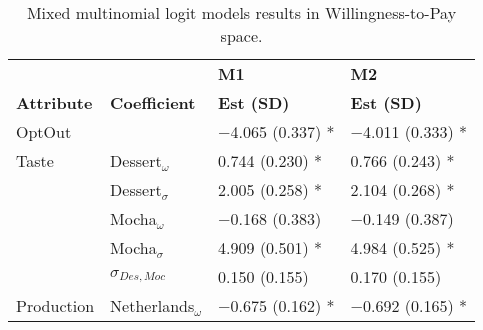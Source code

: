 \documentclass[sustainability,article,accept,moreauthors,pdftex,10pt,a4paper]{Definitions/mdpi}
\theoremstyle{mdpi}
\newcounter{ex}
\newcounter{re}
\theoremstyle{mdpidefinition}
\begin{document}
{{\begin{table}[H]
\centering
\caption{ Mixed multinomial logit models %
results in Willingness-to-Pay space.}
\vspace{-6pt}
\label{tablewtpmmnl}
\begin{tabular}{p{2cm}p{3.5cm} p{3cm} p{3cm}} \\ \toprule
&              & \multicolumn{1}{l}{\textbf{M1}}    & \multicolumn{1}{l}{\textbf{M2}}     \\ %
\textbf{Attribute} & \textbf{Coefficient} &               \textbf{Est (SD) }                    & \textbf{Est (SD) }                    \\ \midrule%
OptOut   &  &                              $-$4.065  (0.337) *              & $-$4.011 (0.333) *              \\
\midrule %
Taste  & Dessert$_\omega$ &              0.744 (0.230) *               & 0.766 (0.243) *               \\ %
& Dessert$_\sigma$ &             2.005 (0.258) *               & 2.104 (0.268) *               \\ %
& Mocha$_\omega$ &                $-$0.168 (0.383)               & $-$0.149 (0.387)               \\ %
& Mocha$_\sigma$ &               4.909 (0.501) *               & 4.984 (0.525) *               \\ %
& $\sigma_{Des,Moc}$&    0.150 (0.155)                & 0.170 (0.155)                \\ %
\midrule
Production&Netherlands$_\omega$&                 $-$0.675 (0.162) *              & $-$0.692 (0.165) *              \\ %

\end{tabular}
\end{table}}}
\end{document}
